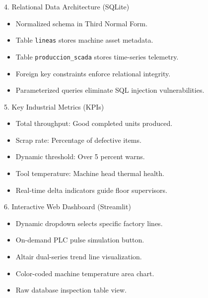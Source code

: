\documentclass[aspectratio=169,11pt]{beamer}
\begin{document}
\begin{frame}{4. Relational Data Architecture (SQLite)}
  \begin{itemize}\setlength{\itemsep}{0.8em}
    \item Normalized schema in Third Normal Form.
    \item Table \texttt{lineas} stores machine asset metadata.
    \item Table \texttt{produccion\_scada} stores time-series telemetry.
    \item Foreign key constraints enforce relational integrity.
    \item Parameterized queries eliminate SQL injection vulnerabilities.
  \end{itemize}
\end{frame}

\begin{frame}{5. Key Industrial Metrics (KPIs)}
  \begin{itemize}\setlength{\itemsep}{0.8em}
    \item Total throughput: Good completed units produced.
    \item Scrap rate: Percentage of defective items.
    \item Dynamic threshold: Over 5 percent warns.
    \item Tool temperature: Machine head thermal health.
    \item Real-time delta indicators guide floor supervisors.
  \end{itemize}
\end{frame}

\begin{frame}{6. Interactive Web Dashboard (Streamlit)}
  \begin{itemize}\setlength{\itemsep}{0.8em}
    \item Dynamic dropdown selects specific factory lines.
    \item On-demand PLC pulse simulation button.
    \item Altair dual-series trend line visualization.
    \item Color-coded machine temperature area chart.
    \item Raw database inspection table view.
  \end{itemize}
\end{frame}
\end{document}
